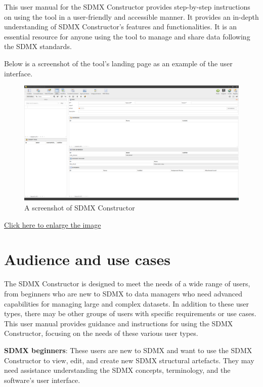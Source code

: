 \documentclass[
]{book}
\theoremstyle{definition}
\theoremstyle{definition}
\theoremstyle{definition}
\theoremstyle{definition}
\theoremstyle{remark}
\begin{document}
This user manual for the SDMX Constructor provides step-by-step instructions on using the tool in a user-friendly and accessible manner. It provides an in-depth understanding of SDMX Constructor's features and functionalities. It is an essential resource for anyone using the tool to manage and share data following the SDMX standards.

Below is a screenshot of the tool's landing page as an example of the user interface.

\begin{figure}

{\centering \includegraphics[width=1\linewidth]{./images/image001} 

}

\caption{A screenshot of SDMX Constructor}\label{fig:front-cover}
\end{figure}

\href{images/image001.png}{Click here to enlarge the image}

\hypertarget{audience-and-use-cases}{%
\section*{Audience and use cases}\label{audience-and-use-cases}}

The SDMX Constructor is designed to meet the needs of a wide range of users, from beginners who are new to SDMX to data managers who need advanced capabilities for managing large and complex datasets. In addition to these user types, there may be other groups of users with specific requirements or use cases. This user manual provides guidance and instructions for using the SDMX Constructor, focusing on the needs of these various user types.

\textbf{SDMX beginners}: These users are new to SDMX and want to use the SDMX Constructor to view, edit, and create new SDMX structural artefacts. They may need assistance understanding the SDMX concepts, terminology, and the software's user interface.
\end{document}
